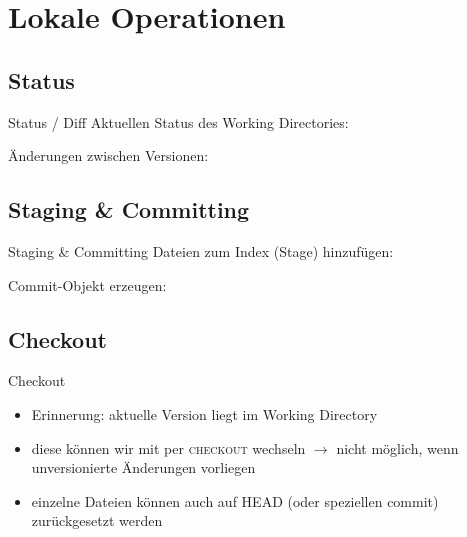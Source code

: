 \section{Lokale Operationen}

\subsection{Status}
\begin{frame}{Status / Diff}
    Aktuellen Status des Working Directories:\\[1em]


    \vspace{1em}

    Änderungen zwischen Versionen:\\[1em]

\end{frame}


\subsection{Staging \& Committing}
\begin{frame}{Staging \& Committing}
    Dateien zum Index (Stage) hinzufügen:\\[1em]


    \vspace{1em}

    Commit-Objekt erzeugen:\\[1em]

\end{frame}


\subsection{Checkout}
\begin{frame}{Checkout}
    \begin{itemize}
        \item Erinnerung: aktuelle Version liegt im Working Directory
        \item diese können wir mit per \textsc{checkout} wechseln
            $\rightarrow$ nicht möglich, wenn unversionierte Änderungen vorliegen
        \item einzelne Dateien können auch auf HEAD (oder speziellen commit)
            zurückgesetzt werden
    \end{itemize}
\end{frame}

